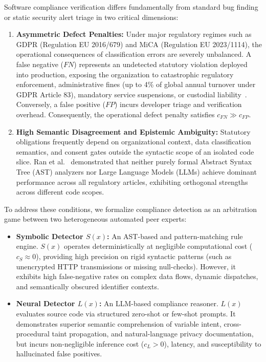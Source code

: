 Software compliance verification differs fundamentally from standard bug finding or static security alert triage in two critical dimensions:
\begin{enumerate}
    \item \textbf{Asymmetric Defect Penalties:} Under major regulatory regimes such as GDPR (Regulation EU 2016/679) and MiCA (Regulation EU 2023/1114), the operational consequences of classification errors are severely unbalanced. A false negative ($FN$) represents an undetected statutory violation deployed into production, exposing the organization to catastrophic regulatory enforcement, administrative fines (up to 4\% of global annual turnover under GDPR Article 83), mandatory service suspensions, or custodial liability~\cite{paramasivan2025ai}. Conversely, a false positive ($FP$) incurs developer triage and verification overhead. Consequently, the operational defect penalty satisfies $c_{FN} \gg c_{FP}$.
    \item \textbf{High Semantic Disagreement and Epistemic Ambiguity:} Statutory obligations frequently depend on organizational context, data classification semantics, and consent gates outside the syntactic scope of an isolated code slice. Ran et al.~\cite{ran2025gdprbenchandroid} demonstrated that neither purely formal Abstract Syntax Tree (AST) analyzers nor Large Language Models (LLMs) achieve dominant performance across all regulatory articles, exhibiting orthogonal strengths across different code scopes.
\end{enumerate}

To address these conditions, we formalize compliance detection as an arbitration game between two heterogeneous automated peer experts:
\begin{itemize}
    \item \textbf{Symbolic Detector $S(x)$:} An AST-based and pattern-matching rule engine. $S(x)$ operates deterministically at negligible computational cost ($c_S \approx 0$), providing high precision on rigid syntactic patterns (such as unencrypted HTTP transmissions or missing null-checks). However, it exhibits high false-negative rates on complex data flows, dynamic dispatches, and semantically obscured identifier contexts.
    \item \textbf{Neural Detector $L(x)$:} An LLM-based compliance reasoner. $L(x)$ evaluates source code via structured zero-shot or few-shot prompts. It demonstrates superior semantic comprehension of variable intent, cross-procedural taint propagation, and natural-language privacy documentation, but incurs non-negligible inference cost ($c_L > 0$), latency, and susceptibility to hallucinated false positives.
\end{itemize}

